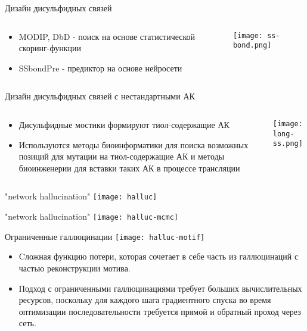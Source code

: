 \begin{frame}{Дизайн дисульфидных связей}
    \begin{columns}
\begin{column}{0.5\textwidth}
    \begin{itemize}
        \item MODIP, DbD - поиск на основе статистической скоринг-функции
        \item SSbondPre - предиктор на основе нейросети
    \end{itemize}
\end{column}
\begin{column}{0.5\textwidth}
    \texttt{[image: ss-bond.png]}
\end{column}
\end{columns}
\end{frame}


\begin{frame}{Дизайн дисульфидных связей с нестандартными АК}
    \begin{columns}
\begin{column}{0.5\textwidth}
    \begin{itemize}
        \item Дисульфидные мостики формируют тиол-содержащие АК
        \item Используются методы биоинформатики для поиска возможных позиций для мутации на тиол-содержащие АК и методы биоинженерии для вставки таких АК в процессе трансляции
    \end{itemize}
\end{column}
\begin{column}{0.5\textwidth}
    \texttt{[image: long-ss.png]}
\end{column}
\end{columns}
\end{frame}

\begin{frame}{"network hallucination"}
    \centering
    \texttt{[image: halluc]}
\end{frame}

\begin{frame}{"network hallucination"}
    \centering
    \texttt{[image: halluc-mcmc]}
\end{frame}


\begin{frame}{Ограниченные галлюцинации}
    \centering
    \texttt{[image: halluc-motif]}
    \begin{itemize}
        \item Cложная функцию потери, которая сочетает в себе часть из галлюцинаций с частью реконструкции мотива. 
        \item Подход с ограниченными галлюцинациями требует больших вычислительных ресурсов, поскольку для каждого шага градиентного спуска во время оптимизации последовательности требуется прямой и обратный проход через сеть.
        \end{itemize}
\end{frame}


